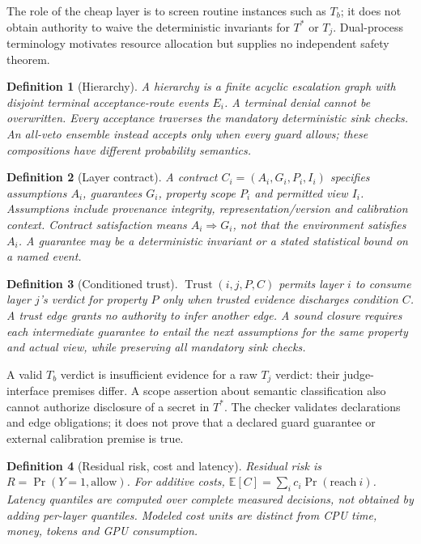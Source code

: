 ﻿\documentclass[lettersize,journal]{IEEEtran}
\newtheorem{definition}{Definition}
\begin{document}
The role of the cheap layer is to screen routine instances such as $T_b$; it
does not obtain authority to waive the deterministic invariants for $T^*$ or
$T_j$. Dual-process terminology motivates resource allocation but supplies no
independent safety theorem.

\begin{definition}[Hierarchy]
A hierarchy is a finite acyclic escalation graph with disjoint terminal
acceptance-route events $E_i$. A terminal denial cannot be overwritten. Every
acceptance traverses the mandatory deterministic sink checks. An all-veto
ensemble instead accepts only when every guard allows; these compositions have
different probability semantics.
\end{definition}

\begin{definition}[Layer contract]
A contract $C_i=(A_i,G_i,P_i,I_i)$ specifies assumptions $A_i$, guarantees
$G_i$, property scope $P_i$ and permitted view $I_i$. Assumptions include
provenance integrity, representation/version and calibration context. Contract
satisfaction means $A_i\Rightarrow G_i$, not that the environment satisfies
$A_i$. A guarantee may be a deterministic invariant or a stated statistical
bound on a named event.
\end{definition}

\begin{definition}[Conditioned trust]
$\operatorname{Trust}(i,j,P,C)$ permits layer $i$ to consume layer $j$'s
verdict for property $P$ only when trusted evidence discharges condition $C$.
A trust edge grants no authority to infer another edge. A sound closure
requires each intermediate guarantee to entail the next assumptions for the
same property and actual view, while preserving all mandatory sink checks.
\end{definition}

A valid $T_b$ verdict is insufficient evidence for a raw $T_j$ verdict:
their judge-interface premises differ. A scope assertion about semantic
classification also cannot authorize disclosure of a secret in $T^*$.
The checker validates declarations and edge obligations; it does not prove
that a declared guard guarantee or external calibration premise is true.

\begin{definition}[Residual risk, cost and latency]
Residual risk is $R=\Pr(Y=1,\mathrm{allow})$. For additive costs,
$\mathbb{E}[C]=\sum_i c_i\Pr(\mathrm{reach}\ i)$.
Latency quantiles are computed over complete measured decisions, not obtained
by adding per-layer quantiles. Modeled cost units are distinct from CPU time,
money, tokens and GPU consumption.
\end{definition}
\end{document}
